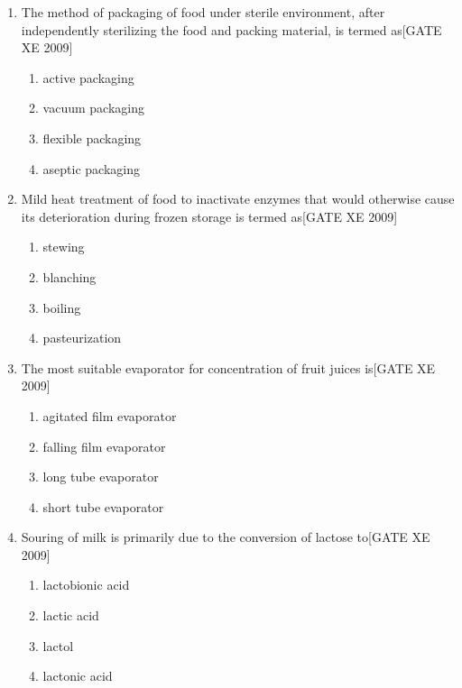 \documentclass[journal,12pt,onecolumn]{IEEEtran}
\theoremstyle{remark}
\begin{document}
\begin{enumerate}
\begin{enumerate}
\begin{enumerate}[label=\textbf{Q.\arabic*.}, wide=0pt, leftmargin=*]
\item The method of packaging of food under sterile environment, after independently sterilizing the food and packing material, is termed as\hfill[GATE XE 2009]
\begin{multicols}{2}
\begin{enumerate}
\item active packaging
\item vacuum packaging
\item flexible packaging
\item aseptic packaging
\end{enumerate}
\end{multicols}

\item Mild heat treatment of food to inactivate enzymes that would otherwise cause its deterioration during frozen storage is termed as\hfill[GATE XE 2009]
\begin{multicols}{2}
\begin{enumerate}
\item stewing
\item blanching
\item boiling
\item pasteurization
\end{enumerate}
\end{multicols}

\item The most suitable evaporator for concentration of fruit juices is\hfill[GATE XE 2009]
\begin{multicols}{2}
\begin{enumerate}
\item agitated film evaporator
\item falling film evaporator
\item long tube evaporator
\item short tube evaporator
\end{enumerate}
\end{multicols}

\item Souring of milk is primarily due to the conversion of lactose to\hfill[GATE XE 2009]
\begin{multicols}{2}
\begin{enumerate}
\item lactobionic acid
\item lactic acid
\item lactol
\item lactonic acid
\end{enumerate}
\end{multicols}


\end{enumerate}
\end{enumerate}
\end{enumerate}
\end{document}
